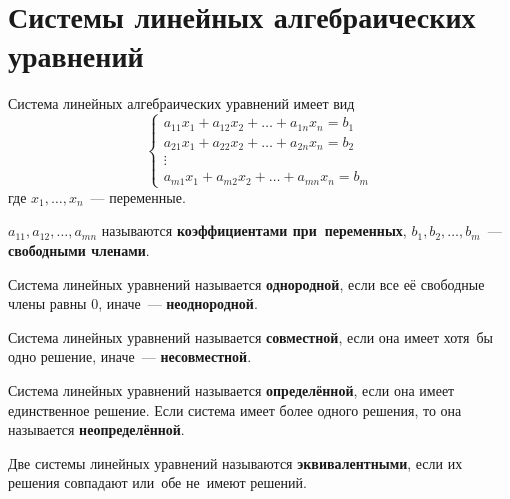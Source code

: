 \section{Системы линейных алгебраических уравнений}
Система линейных алгебраических уравнений имеет вид
\begin{equation*}
\begin{cases}
a_{11}x_1 + a_{12}x_2 + \dots + a_{1n}x_n = b_1 \\
a_{21}x_1 + a_{22}x_2 + \dots + a_{2n}x_n = b_2 \\
\vdots \\
a_{m1}x_1 + a_{m2}x_2 + \dots + a_{mn}x_n = b_m
\end{cases}
\end{equation*}
где $x_1, \ldots, x_n$~--- переменные.

$a_{11}, a_{12}, \ldots, a_{mn}$ называются \textbf{коэффициентами при~переменных}, $b_1, b_2, \dots, b_m$~--- \textbf{свободными членами}.

Система линейных уравнений называется \textbf{однородной}, если все её свободные члены равны 0, иначе~--- \textbf{неоднородной}.

Система линейных уравнений называется \textbf{совместной}, если она имеет хотя~бы одно решение, иначе~--- \textbf{несовместной}.

Система линейных уравнений называется \textbf{определённой}, если она имеет единственное решение.
Если система имеет более одного решения, то она называется \textbf{неопределённой}.

Две системы линейных уравнений называются \textbf{эквивалентными}, если их решения совпадают или~обе не~имеют решений.